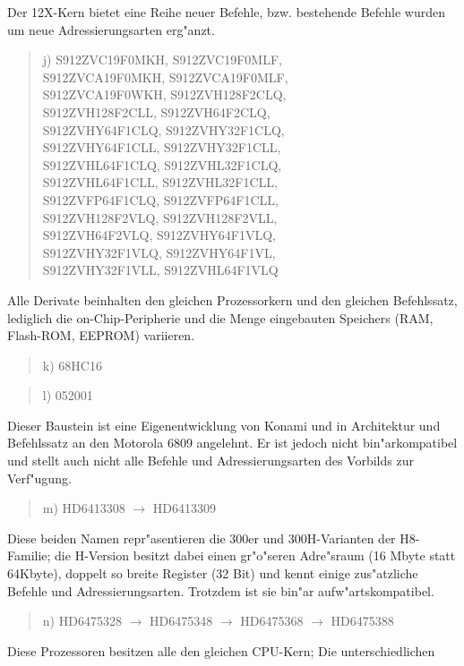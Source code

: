 \documentclass[12pt,a4paper,twoside]{report}
\begin{document}
Der 12X-Kern bietet eine Reihe neuer Befehle, bzw. bestehende Befehle
wurden um neue Adressierungsarten erg"anzt.
\begin{quote}
j) S912ZVC19F0MKH, S912ZVC19F0MLF,\\
   S912ZVCA19F0MKH, S912ZVCA19F0MLF,\\
   S912ZVCA19F0WKH, S912ZVH128F2CLQ,\\
   S912ZVH128F2CLL, S912ZVH64F2CLQ,\\
   S912ZVHY64F1CLQ, S912ZVHY32F1CLQ,\\
   S912ZVHY64F1CLL, S912ZVHY32F1CLL,\\
   S912ZVHL64F1CLQ, S912ZVHL32F1CLQ,\\
   S912ZVHL64F1CLL, S912ZVHL32F1CLL,\\
   S912ZVFP64F1CLQ, S912ZVFP64F1CLL,\\
   S912ZVH128F2VLQ, S912ZVH128F2VLL,\\
   S912ZVH64F2VLQ, S912ZVHY64F1VLQ,\\
   S912ZVHY32F1VLQ, S912ZVHY64F1VL,\\
   S912ZVHY32F1VLL, S912ZVHL64F1VLQ 
\end{quote}
Alle Derivate beinhalten den gleichen Prozessorkern und den
gleichen Befehlssatz, lediglich die on-Chip-Peripherie und
die Menge eingebauten Speichers (RAM, Flash-ROM, EEPROM)
variieren.
\begin{quote}
k) 68HC16
\end{quote}
\begin{quote}
l) 052001
\end{quote}
Dieser Baustein ist eine Eigenentwicklung von Konami und in
Architektur und Befehlssatz an den Motorola 6809 angelehnt.
Er ist jedoch nicht bin"arkompatibel und stellt auch nicht
alle Befehle und Adressierungsarten des Vorbilds zur Verf"ugung.
\begin{quote}
m) HD6413308 $\longrightarrow$ HD6413309
\end{quote}
Diese beiden Namen repr"asentieren die 300er und 300H-Varianten der
H8-Familie; die H-Version besitzt dabei einen gr"o"seren Adre"sraum
(16 Mbyte statt 64Kbyte), doppelt so breite Register (32 Bit) und
kennt einige zus"atzliche Befehle und Adressierungsarten.  Trotzdem
ist sie bin"ar aufw"artskompatibel.
\begin{quote}
n) HD6475328 $\longrightarrow$ HD6475348 $\longrightarrow$
   HD6475368 $\longrightarrow$ HD6475388
\end{quote}
Diese Prozessoren besitzen alle den gleichen CPU-Kern; Die unterschiedlichen
\end{document}
